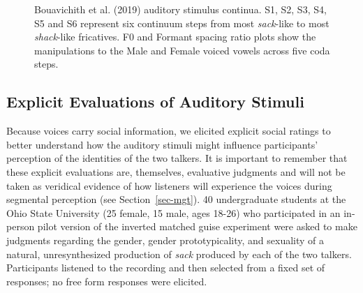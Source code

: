 \documentclass[
  letterpaper,
  DIV=11,
  numbers=noendperiod]{scrartcl}
\begin{document}
\begin{figure}


\caption{\label{fig-stimuli}Bouavichith et al. (2019) auditory stimulus
continua. S1, S2, S3, S4, S5 and S6 represent six continuum steps from
most \emph{sack}-like to most \emph{shack}-like fricatives. F0 and
Formant spacing ratio plots show the manipulations to the Male and
Female voiced vowels across five coda steps.}

\end{figure}%

\subsection{Explicit Evaluations of Auditory
Stimuli}\label{sec-stim-evals}

Because voices carry social information, we elicited explicit social
ratings to better understand how the auditory stimuli might influence
participants' perception of the identities of the two talkers. It is
important to remember that these explicit evaluations are, themselves,
evaluative judgments and will not be taken as veridical evidence of how
listeners will experience the voices during segmental perception (see
Section~\ref{sec-mgt}). 40 undergraduate students at the Ohio State
University (25 female, 15 male, ages 18-26) who participated in an
in-person pilot version of the inverted matched guise experiment were
asked to make judgments regarding the gender, gender prototypicality,
and sexuality of a natural, unresynthesized production of \emph{sack}
produced by each of the two talkers. Participants listened to the
recording and then selected from a fixed set of responses; no free form
responses were elicited.
\end{document}
